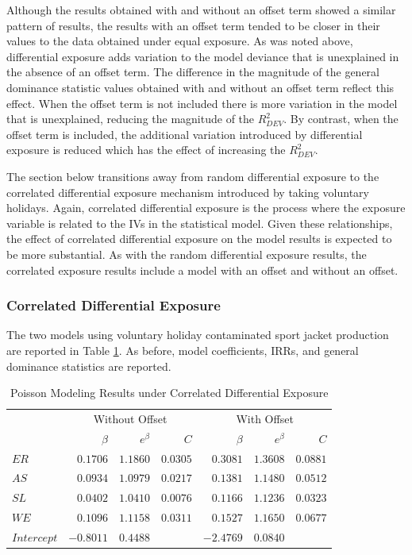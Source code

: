 \documentclass[ShortAfour,times,sageapa]{sagej}
\begin{document}
	Although the results obtained with and without an offset term showed a similar pattern of results, the results with an offset term tended to be closer in their values to the data obtained under equal exposure.
	As was noted above, differential exposure adds variation to the model deviance that is unexplained in the absence of an offset term.
	The difference in the magnitude of the general dominance statistic values obtained with and without an offset term reflect this effect.
	When the offset term is not included there is more variation in the model that is unexplained, reducing the magnitude of the $R^2_{DEV}$.
	By contrast, when the offset term is included, the additional variation introduced by differential exposure is reduced which has the effect of increasing the $R^2_{DEV}$.
	
	The section below transitions away from random differential exposure to the correlated differential exposure mechanism introduced by taking voluntary holidays.
	Again, correlated differential exposure is the process where the exposure variable is related to the IVs in the statistical model.
	Given these relationships, the effect of correlated differential exposure on the model results is expected to be more substantial.
	As with the random differential exposure results, the correlated exposure results include a model with an offset and without an offset.
	
		\subsubsection{Correlated Differential Exposure}
		
	The two models using voluntary holiday contaminated sport jacket production are reported in Table \ref{tab:exp}.
	As before, model coefficients, IRRs, and general dominance statistics are reported.
	
	\begin{table}[h!]
		\centering
		\caption{\centering Poisson Modeling Results under Correlated Differential Exposure}
		\begin{tabular}{l|rrrrrr}
			\toprule
			\multicolumn{1}{l}{} & \multicolumn{3}{c}{Without Offset} & \multicolumn{3}{c}{With Offset} \\ 
			\cmidrule(lr){2-4} \cmidrule(lr){5-7}
			\multicolumn{1}{l}{} & $\beta$ & $e^{\beta}$ & $C$ & $\beta$ & $e^{\beta}$ & $C$ \\ 
			\midrule
			$ER$ & $0.1706$ & $1.1860$ & $0.0305$ & $0.3081$ & $1.3608$ & $0.0881$ \\ 
			$AS$ & $0.0934$ & $1.0979$ & $0.0217$ & $0.1381$ & $1.1480$ & $0.0512$ \\
			$SL$ & $0.0402$ & $1.0410$ & $0.0076$ & $0.1166$ & $1.1236$ & $0.0323$ \\ 
			$WE$ & $0.1096$ & $1.1158$ & $0.0311$ & $0.1527$ & $1.1650$ & $0.0677$ \\
			$Intercept$ & $-0.8011$ & $0.4488$ & & $-2.4769$ & $0.0840$ & \\
			\bottomrule
		\end{tabular}
		\label{tab:exp}
	\end{table}
	
\end{document}
